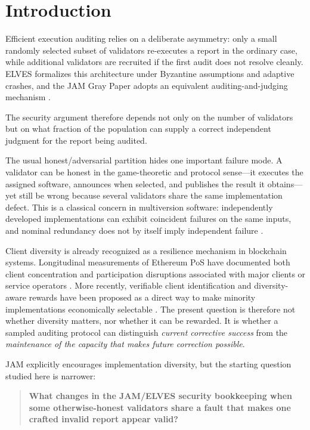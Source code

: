 \section{Introduction}

Efficient execution auditing relies on a deliberate asymmetry: only a small randomly selected subset of validators re-executes a report in the ordinary case, while additional validators are recruited if the first audit does not resolve cleanly. ELVES formalizes this architecture under Byzantine assumptions and adaptive crashes, and the JAM Gray Paper adopts an equivalent auditing-and-judging mechanism \citep{burdges2024,wood2026}.

The security argument therefore depends not only on the number of validators but on what fraction of the population can supply a correct independent judgment for the report being audited.

The usual honest/adversarial partition hides one important failure mode. A validator can be honest in the game-theoretic and protocol sense---it executes the assigned software, announces when selected, and publishes the result it obtains---yet still be wrong because several validators share the same implementation defect. This is a classical concern in multiversion software: independently developed implementations can exhibit coincident failures on the same inputs, and nominal redundancy does not by itself imply independent failure \citep{eckhardt1985,littlewood1989}.

Client diversity is already recognized as a resilience mechanism in blockchain systems. Longitudinal measurements of Ethereum PoS have documented both client concentration and participation disruptions associated with major clients or service operators \citep{grandjean2023}. More recently, verifiable client identification and diversity-aware rewards have been proposed as a direct way to make minority implementations economically selectable \citep{ron2026}. The present question is therefore not whether diversity matters, nor whether it can be rewarded. It is whether a sampled auditing protocol can distinguish \emph{current corrective success} from the \emph{maintenance of the capacity that makes future correction possible}.

JAM explicitly encourages implementation diversity, but the starting question studied here is narrower:

\begin{quote}
\textbf{What changes in the JAM/ELVES security bookkeeping when some otherwise-honest validators share a fault that makes one crafted invalid report appear valid?}
\end{quote}

